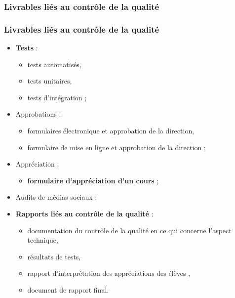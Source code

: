 					\subsubsection{Livrables liés au contrôle de la qualité} 
							\begin{frame}[allowframebreaks]
							\frametitle{Livrables liés au contrôle de la qualité}
                        			
							\begin{itemize}
							
							\item \textbf{Tests} : 
								\begin{itemize}
								\item tests automatisés,
								\item tests unitaires,
								\item tests d’intégration ;
								\end{itemize}
							\item Approbations :
								\begin{itemize}
								\item formulaires électronique et approbation de la direction,
								\item formulaire de mise en ligne et approbation de la direction ;
								\end{itemize}
							\item Appréciation : 
								\begin{itemize}
								\item \textbf{formulaire d’appréciation d’un cours} ;
								\end{itemize}
							\framebreak
							\item Audits de médias sociaux ;
							\item \textbf{Rapports liés au contrôle de la qualité} :
								\begin{itemize}
								\item documentation du contrôle de la qualité en ce qui concerne l’aspect technique,
								\item résultats de tests,
								\item rapport d’interprétation des appréciations des élèves ,
								\item document de rapport final.
								
								
								\end{itemize}
							\end{itemize}						
					\end{frame}

